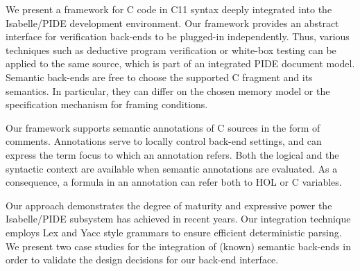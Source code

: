 %
\begin{isabellebody}%
%
%
\isadelimtheory
%
\endisadelimtheory
%
\isatagtheory
%
\endisatagtheory
{\isafoldtheory}%
%
\isadelimtheory
%
\endisadelimtheory
%
\isadelimML
%
\endisadelimML
%
\isatagML
%
\endisatagML
{\isafoldML}%
%
\isadelimML
%
\endisadelimML
%
\begin{isamarkuptext*}%
[label = {abs},type = {scholarly_paper.abstract}, args={label = {abs},type = {scholarly_paper.abstract}, scholarly_paper.abstract.keywordlist = {{User Interface, Integrated Development, Program Verification, Shallow Embedding}}}]We present a framework for C code in C11 syntax deeply integrated into the Isabelle/PIDE
  development environment. Our framework provides an abstract interface for verification back-ends
  to be plugged-in independently. Thus, various techniques such as deductive program verification or
  white-box testing can be applied to the same source, which is part of an integrated PIDE document
  model. Semantic back-ends are free to choose the supported C fragment and its semantics. In
  particular, they can differ on the chosen memory model or the specification mechanism
  for framing conditions.

  Our framework supports semantic annotations of C sources in the form of comments. Annotations
  serve to locally control back-end settings, and can express the term focus to which
  an annotation refers. Both the logical and the syntactic context are available when semantic
  annotations are evaluated. As a consequence, a formula in an annotation can refer both 
  to  HOL or C variables.

  Our approach demonstrates the degree of maturity and expressive power the Isabelle/PIDE subsystem
  has achieved in recent years. Our integration technique employs Lex and Yacc style grammars to 
  ensure efficient deterministic parsing. We present two case studies for the integration of 
  (known) semantic back-ends in order to validate the design decisions for our
  back-end interface.


\end{isamarkuptext*}
\end{isabellebody}
